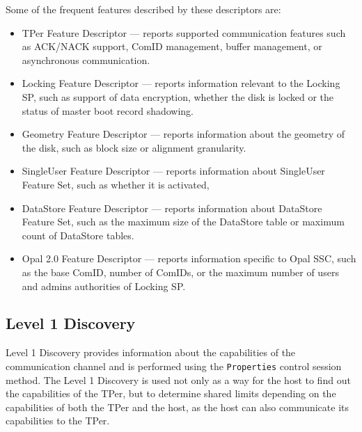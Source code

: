 Some of the frequent features described by these descriptors are:
\begin{itemize}
\item TPer Feature Descriptor --- reports supported communication features such as ACK/NACK support, ComID management, buffer management, or asynchronous communication.
\item Locking Feature Descriptor --- reports information relevant to the Locking SP, such as support of data encryption, whether the disk is locked or the status of master boot record shadowing.
\item Geometry Feature Descriptor --- reports information about the geometry of the disk, such as block size or alignment granularity.
\item SingleUser Feature Descriptor --- reports information about SingleUser Feature Set, such as whether it is activated,
\item DataStore Feature Descriptor --- reports information about DataStore Feature Set, such as the maximum size of the DataStore table or maximum count of DataStore tables. 
\item Opal 2.0 Feature Descriptor --- reports information specific to Opal SSC, such as the base ComID, number of ComIDs, or the maximum number of users and admins authorities of Locking SP.
\end{itemize}

\subsection{Level 1 Discovery}

Level 1 Discovery provides information about the capabilities of the communication channel and is performed using the \verb|Properties| control session method. The Level 1 Discovery is used not only as a way for the host to find out the capabilities of the TPer, but to determine shared limits depending on the capabilities of both the TPer and the host, as the host can also communicate its capabilities to the TPer.

